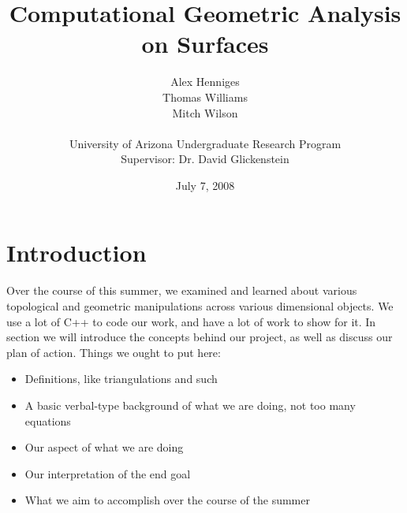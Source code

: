 \documentclass[12pt]{article}
\title{Computational Geometric Analysis on Surfaces}
\author{Alex Henniges \\ Thomas Williams \\ Mitch Wilson \\ \\ University of Arizona Undergraduate Research Program\\
Supervisor: Dr. David Glickenstein\\
}
\date{July 7, 2008}
\begin{document}
	\maketitle
  \newpage
  \section{Introduction}
  \maketitle
  Over the course of this summer, we examined and learned about various topological and geometric manipulations across various dimensional objects. We use a lot of C++ to code our work, and have a lot of work to show for it. In section we will introduce the concepts behind our project, as well as discuss our plan of action. 
  Things we ought to put here:
  \begin{itemize}
  \item Definitions, like triangulations and such
  \item A basic verbal-type background of what we are doing, not too many equations
  \item Our aspect of what we are doing
  \item Our interpretation of the end goal
  \item What we aim to accomplish over the course of the summer
  \end{itemize}
  
\end{document}

